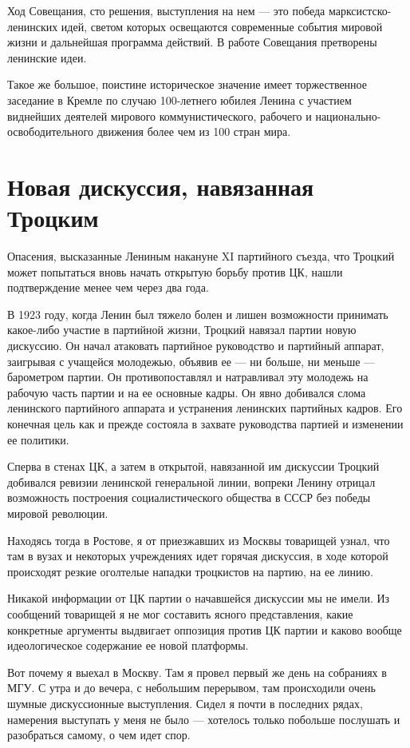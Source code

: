 \documentclass[12pt, a4paper, openany]{book}
\begin{document}
Ход Совещания, сто решения, выступления на нем — это победа марксистско-ленинских идей, светом которых освещаются современные события мировой жизни и дальнейшая программа действий. В работе Совещания претворены ленинские идеи.

Такое же большое, поистине историческое значение имеет торжественное заседание в Кремле по случаю 100-летнего юбилея Ленина с участием виднейших деятелей мирового коммунистического, рабочего и национально-освободительного движения более чем из 100 стран мира.

\newpage
\section[Новая дискуссия, навязанная Троцким]{\center \textbf{Новая дискуссия, навязанная Троцким}}


Опасения, высказанные Лениным накануне XI партийного съезда, что Троцкий может попытаться вновь начать открытую борьбу против ЦК, нашли подтверждение менее чем через два года.

В 1923 году, когда Ленин был тяжело болен и лишен возможности принимать какое-либо участие в партийной жизни, Троцкий навязал партии новую дискуссию. Он начал атаковать партийное руководство и партийный аппарат, заигрывая с учащейся молодежью, объявив ее — ни больше, ни меньше — барометром партии. Он противопоставлял и натравливал эту молодежь на рабочую часть партии и на ее основные кадры. Он явно добивался слома ленинского партийного аппарата и устранения ленинских партийных кадров. Его конечная цель как и прежде состояла в захвате руководства партией и изменении ее политики.

Сперва в стенах ЦК, а затем в открытой, навязанной им дискуссии Троцкий добивался ревизии ленинской генеральной линии, вопреки Ленину отрицал возможность построения социалистического общества в СССР без победы мировой революции.

Находясь тогда в Ростове, я от приезжавших из Москвы товарищей узнал, что там в вузах и некоторых учреждениях идет горячая дискуссия, в ходе которой происходят резкие оголтелые нападки троцкистов на партию, на ее линию.

Никакой информации от ЦК партии о начавшейся дискуссии мы не имели. Из сообщений товарищей я не мог составить ясного представления, какие конкретные аргументы выдвигает оппозиция против ЦК партии и каково вообще идеологическое содержание ее новой платформы.

Вот почему я выехал в Москву. Там я провел первый же день на собраниях в МГУ. С утра и до вечера, с небольшим перерывом, там происходили очень шумные дискуссионные выступления. Сидел я почти в последних рядах, намерения выступать у меня не было — хотелось только побольше послушать и разобраться самому, о чем идет спор.
\end{document}
